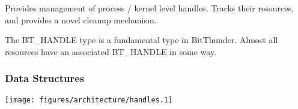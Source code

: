 Provides management of process / kernel level handles. Tracks their resources, and provides a novel cleanup
mechanism.

The BT_HANDLE type is a fundamental type in BitThunder. Almost all resources have an associated BT_HANDLE in some
way. 

\subsubsection{Data Structures}
\texttt{[image: figures/architecture/handles.1]}
